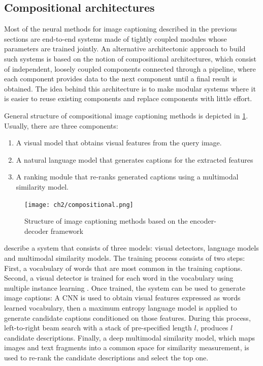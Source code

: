 \subsection{Compositional architectures}\label{sec:compositional_architectures}

Most of the neural methods for image captioning described in the previous sections are end-to-end systems made of tightly coupled modules whose parameters are trained jointly. An alternative architectonic approach to build such systems is based on the notion of compositional architectures, which consist of independent, loosely coupled components connected through a pipeline, where each component provides data to the next component until a final result is obtained. The idea behind this architecture is to make modular systems where it is easier to reuse existing components and replace components with little effort.

General structure of compositional image captioning methods is depicted in \cref{fig:compositional}. Usually, there are three components: 
\begin{enumerate}
\item A visual model that obtains visual features from the query image.
\item A natural language model that generates captions for the extracted features
\item A ranking module that re-ranks generated captions using a multimodal similarity model.
\end{enumerate}

\begin{figure}[hpt]
	\centering
	\texttt{[image: ch2/compositional.png]}
	\caption{Structure of image captioning methods based on the encoder-decoder framework}
	\label{fig:compositional}
\end{figure}

\citet{Fang2015} describe a system that consists of three models: visual detectors, language models and multimodal similarity models. The training process consists of two steps: First, a vocabulary of words that are most common in the training captions. Second, a visual detector is trained for each word in the vocabulary using multiple instance learning  \citep{Viola2005}. Once trained, the system can be used to generate image captions: A CNN \citep{Krizhevsky2012} is used to obtain visual features expressed as words learned vocabulary, then a maximum entropy language model \citep{Berger1996} is applied to generate candidate captions conditioned on those features. During this process, left-to-right beam search \citep{Ratnaparkhi2000} with a stack of pre-specified length $l$, produces $l$ candidate descriptions. Finally, a deep multimodal similarity model, which maps images and text fragments into a common space for similarity measurement, is used to re-rank the candidate descriptions and select the top one.

